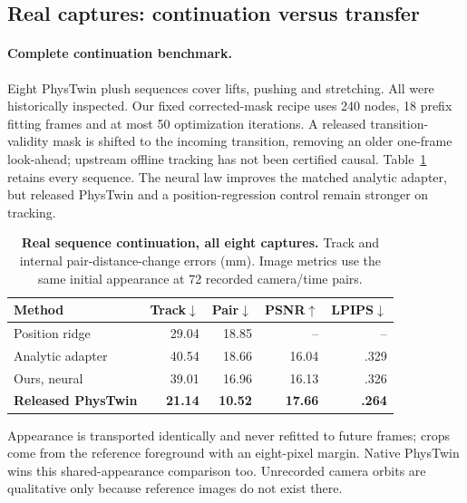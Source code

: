 \documentclass[10pt,twocolumn,letterpaper]{article}
\begin{document}
\subsection{Real captures: continuation versus transfer}
\paragraph{Complete continuation benchmark.}
Eight PhysTwin plush sequences cover lifts, pushing and stretching. All were historically inspected. Our fixed corrected-mask recipe uses 240 nodes, 18 prefix fitting frames and at most 50 optimization iterations. A released transition-validity mask is shifted to the incoming transition, removing an older one-frame look-ahead; upstream offline tracking has not been certified causal. Table~\ref{tab:real} retains every sequence. The neural law improves the matched analytic adapter, but released PhysTwin and a position-regression control remain stronger on tracking.
\begin{table}[t]
\centering\small\setlength{\tabcolsep}{3pt}
\caption{\textbf{Real sequence continuation, all eight captures.} Track and internal pair-distance-change errors (mm). Image metrics use the same initial appearance at 72 recorded camera/time pairs.}
\label{tab:real}
\begin{tabular}{lrrrr}\toprule
Method & Track$\downarrow$ & Pair$\downarrow$ & PSNR$\uparrow$ & LPIPS$\downarrow$\\\midrule
Position ridge &29.04&18.85&--&--\\
Analytic adapter &40.54&18.66&16.04&.329\\
Ours, neural &39.01&16.96&16.13&.326\\
\textbf{Released PhysTwin} &\textbf{21.14}&\textbf{10.52}&\textbf{17.66}&\textbf{.264}\\\bottomrule
\end{tabular}
\end{table}
Appearance is transported identically and never refitted to future frames; crops come from the reference foreground with an eight-pixel margin. Native PhysTwin wins this shared-appearance comparison too. Unrecorded camera orbits are qualitative only because reference images do not exist there.
\end{document}
